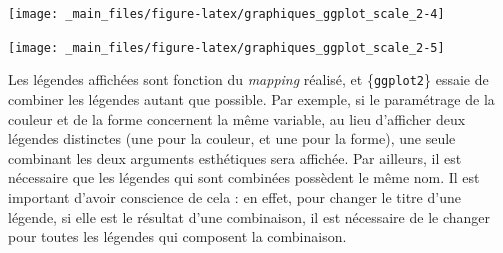\documentclass[
  11pt,
]{book}
\newenvironment{Shaded}{\begin{snugshade}}{\end{snugshade}}
\newcommand{\CommentTok}[1]{\textcolor[rgb]{0.56,0.35,0.01}{\textit{#1}}}
\newcommand{\DataTypeTok}[1]{\textcolor[rgb]{0.13,0.29,0.53}{#1}}
\newcommand{\DecValTok}[1]{\textcolor[rgb]{0.00,0.00,0.81}{#1}}
\newcommand{\KeywordTok}[1]{\textcolor[rgb]{0.13,0.29,0.53}{\textbf{#1}}}
\newcommand{\NormalTok}[1]{#1}
\newcommand{\OperatorTok}[1]{\textcolor[rgb]{0.81,0.36,0.00}{\textbf{#1}}}
\newcommand{\StringTok}[1]{\textcolor[rgb]{0.31,0.60,0.02}{#1}}
\numberwithin{equation}{section}
\numberwithin{countremarque}{section}
\begin{document}
\begin{center}\texttt{[image: \_main\_files/figure-latex/graphiques\_ggplot\_scale\_2-4]} \end{center}

\begin{Shaded}
\end{Shaded}

\begin{center}\texttt{[image: \_main\_files/figure-latex/graphiques\_ggplot\_scale\_2-5]} \end{center}

Les légendes affichées sont fonction du \emph{mapping} réalisé, et \{\texttt{ggplot2}\} essaie de combiner les légendes autant que possible. Par exemple, si le paramétrage de la couleur et de la forme concernent la même variable, au lieu d'afficher deux légendes distinctes (une pour la couleur, et une pour la forme), une seule combinant les deux arguments esthétiques sera affichée. Par ailleurs, il est nécessaire que les légendes qui sont combinées possèdent le même nom. Il est important d'avoir conscience de cela : en effet, pour changer le titre d'une légende, si elle est le résultat d'une combinaison, il est nécessaire de le changer pour toutes les légendes qui composent la combinaison.
\end{document}
